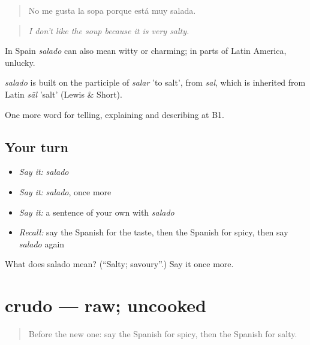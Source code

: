 \begin{quote}
No me gusta la sopa porque está muy salada.
\end{quote}

\begin{quote}
\emph{I don't like the soup because it is very salty.}
\end{quote}

In Spain \emph{salado} can also mean witty or charming; in parts of Latin America, unlucky.

\begin{cousinweb}
\emph{salado} is built on the participle of \emph{salar} 'to salt', from \emph{sal}, which is inherited from Latin \emph{sāl} 'salt' (Lewis \& Short).
\end{cousinweb}

\begin{grammarlens}[title={What you've built}]
One more word for telling, explaining and describing at B1.
\end{grammarlens}

\subsection*{Your turn}
\begin{itemize}
\raggedright
  \item \emph{Say it:} \emph{salado}
  \item \emph{Say it:} \emph{salado}, once more
  \item \emph{Say it:} a sentence of your own with \emph{salado}
  \item \emph{Recall:} say the Spanish for the taste, then the Spanish for spicy, then say \emph{salado} again
\end{itemize}

\begin{tcolorbox}[breakable,colback=teal!4,colframe=teal!35!black,title={Before you move on}]
What does salado mean? (\textquotedblleft{}Salty; savoury\textquotedblright{}.) Say it once more.
\end{tcolorbox}
\section[crudo]{crudo — raw; uncooked}

\label{lesson:ES-C771-crudo}



\begin{quote}
Before the new one: say the Spanish for spicy, then the Spanish for salty.
\end{quote}

